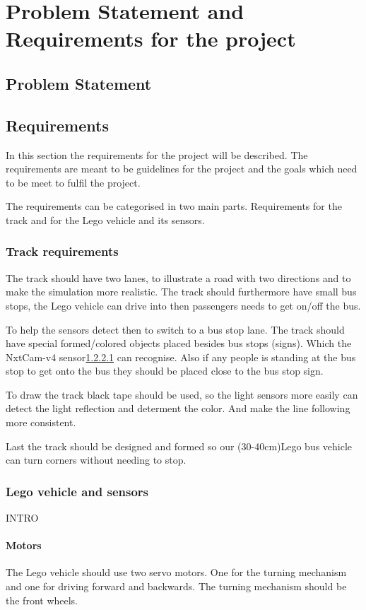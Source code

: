 \chapter{Problem Statement and Requirements for the project}

\section{Problem Statement}

\section{Requirements}
In this section the requirements for the project will be described. The requirements are meant to be guidelines for the project and the goals which need to be meet to fulfil the project.

The requirements can be categorised in two main parts. Requirements for the track and for the Lego vehicle and its sensors. 

\subsection{Track requirements}
The track should have two lanes, to illustrate a road with two directions and to make the simulation more realistic. The track should furthermore have small bus stops, the Lego vehicle can drive into then passengers needs to get on/off the bus.

To help the sensors detect then to switch to a bus stop lane. The track should have special formed/colored objects placed besides bus stops (signs). Which the NxtCam-v4 sensor\ref{} can recognise. Also if any people is standing at the bus stop to get onto the bus they should be placed close to the bus stop sign. 

To draw the track black tape should be used, so the light sensors more easily can detect the light reflection and determent the color. And make the line following more consistent.

Last the track should be designed and formed so our (30-40cm)Lego bus vehicle can turn corners without needing to stop.  


\subsection{Lego vehicle and sensors}
INTRO

\subsubsection{Motors}
The Lego vehicle should use two servo motors. One for the turning mechanism and one for driving forward and backwards. The turning mechanism should be the front wheels. 

